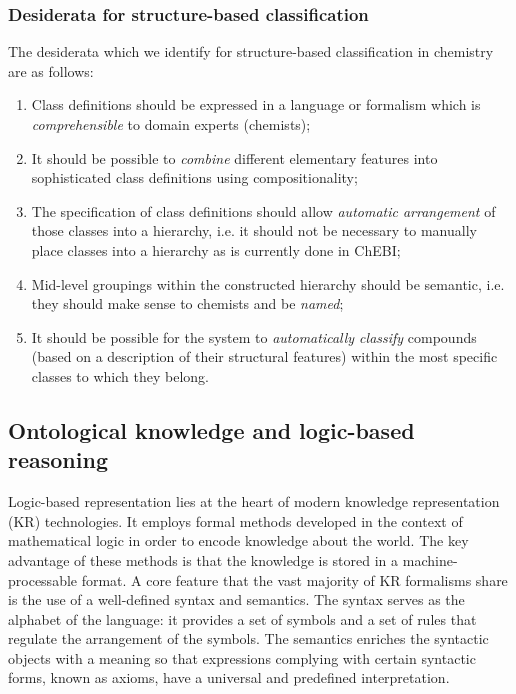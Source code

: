 \documentclass[10pt]{bmc_article}
\newenvironment{bmcformat}{\baselineskip20pt\sloppy\setboolean{publ}{false}}{\baselineskip20pt\sloppy}
\begin{document}
\begin{bmcformat}
\subsubsection*{Desiderata for structure-based classification}
The desiderata which we identify for structure-based classification in chemistry are as follows:
\begin{enumerate}
	\item Class definitions should be expressed in a language or formalism which is \textit{comprehensible} to domain experts (chemists);
  \item It should be possible to \textit{combine} different elementary features into sophisticated class definitions using compositionality;	
	\item The specification of class definitions should allow \textit{automatic arrangement} of those classes into a hierarchy, i.e. it should not be necessary to manually place classes into a hierarchy as is currently done in ChEBI;
	\item Mid-level groupings within the constructed hierarchy should be semantic, i.e. they should make sense to chemists and be \textit{named};
	\item It should be possible for the system to \textit{automatically classify} compounds (based on a description of their structural features) within the most specific classes to which they belong. 
\end{enumerate}


\subsection*{Ontological knowledge and logic-based reasoning}
\label{sec:backlogic}

Logic-based representation lies at the heart of modern knowledge representation (KR) technologies. It employs formal methods developed in the context of mathematical logic in order to encode knowledge about the world. The key advantage of these methods is that the knowledge is stored in a machine-processable format. A core feature that the vast majority of KR formalisms share is the use of a well-defined syntax and semantics. The syntax serves as the alphabet of the language: it provides a set of symbols and a set of rules that regulate the arrangement of the symbols. The semantics enriches the syntactic objects with a meaning so that expressions complying with certain syntactic forms, known as axioms, have a universal and predefined interpretation. 


\end{bmcformat}
\end{document}
